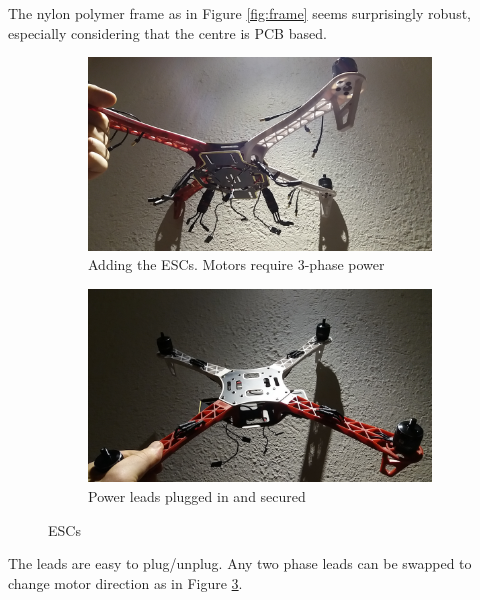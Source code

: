 The nylon polymer frame as in Figure \ref{fig:frame} seems surprisingly robust, especially considering that the centre is PCB based.\\

\begin{figure}[H]
\begin{subfigure}{0.5\textwidth}
\centering
\includegraphics[scale=0.1]{images/drone-build-esc-3phaseunconnected.jpg}
\caption{Adding the ESCs. Motors require 3-phase power}
\label{fig:ESCs_uplugged}
\end{subfigure}
\begin{subfigure}{0.5\textwidth}
\centering
\includegraphics[scale=0.1]{images/drone-build-esc-3phaseconnected.jpg}
\caption{Power leads plugged in and secured}
\label{fig:ESCs_plugged}
\end{subfigure}
\caption{ESCs}
\label{fig:ESC}
\end{figure}

The leads are easy to plug/unplug. Any two phase leads can be swapped to change motor direction as in Figure \ref{fig:ESC}.\\


